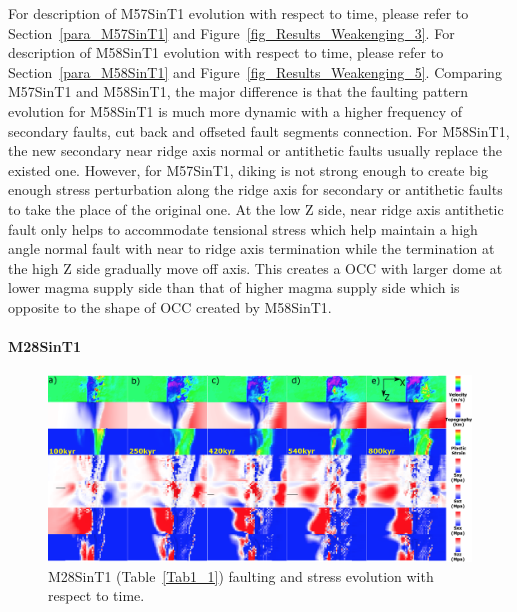 For description of M57SinT1 evolution with respect to time, please refer to Section~\hyperref[para_M57SinT1]{\ref{para_M57SinT1}} and Figure~\hyperref[fig_Results_Weakenging_3]{\ref{fig_Results_Weakenging_3}}. For description of M58SinT1 evolution with respect to time, please refer to  Section~\hyperref[para_M58SinT1]{\ref{para_M58SinT1}} and Figure~\hyperref[fig_Results_Weakenging_5]{\ref{fig_Results_Weakenging_5}}. Comparing M57SinT1 and M58SinT1, the major difference is that the faulting pattern evolution for M58SinT1 is much more dynamic with a higher frequency of secondary faults, cut back and offseted fault segments connection. For M58SinT1, the new secondary near ridge axis normal or antithetic faults usually replace the existed one. However, for M57SinT1, diking is not strong enough to create big enough stress perturbation along the ridge axis for secondary or antithetic faults to take the place of the original one. At the low Z side, near ridge axis antithetic fault only helps to accommodate tensional stress which help maintain a high angle normal fault with near to ridge axis termination while the termination at the high Z side gradually move off axis. This creates a OCC with larger dome at lower magma supply side than that of higher magma supply side which is opposite to the shape of OCC created by M58SinT1. 

\paragraph{M28SinT1}\label{para_M28SinT1}

\begin{figure}[h]
 \centering
  \includegraphics[width=1.0\textwidth]{./Figures/fig_Results_MRange_1_M28SinT1_time_evolution.eps}
 \caption{M28SinT1 (Table~\hyperref[Tab1_1]{\ref{Tab1_1}}) faulting and stress evolution with respect to time.}
\label{fig_Results_MRange_1}
\end{figure}

